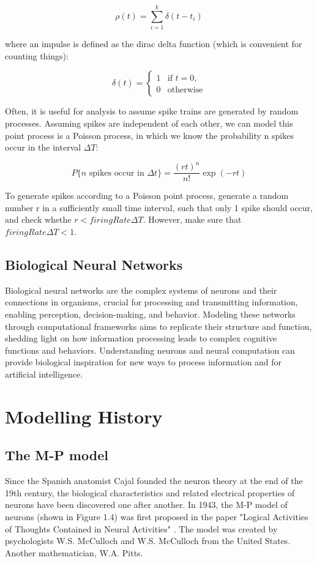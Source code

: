 \documentclass[12pt,a4paper]{report}
\begin{document}
\begin{equation}
    \rho(t) = \sum_{i=1}^{k} \delta(t-t_i)
\end{equation}

where an impulse is defined as the dirac delta function (which is convenient for counting things):

\begin{equation}
    \delta(t) = \begin{cases} 1 & \text{if } t = 0, \\ 0 & \text{otherwise} \end{cases}
\end{equation}

Often, it is useful for analysis to assume spike trains are generated by random processes. Assuming spikes are independent of each other, we can model this point process is a Poisson process, in which we know the probability n spikes occur in the interval $\Delta T$:

\begin{equation}
    P\{n \text{ spikes occur in } \Delta t\} = \frac{(rt)^n}{n!} \exp(-rt)
\end{equation}

To generate spikes according to a Poisson point process, generate a random number r in a sufficiently small time interval, such that only 1 spike should occur, and check whethe $r < firingRate \Delta T$. However, make sure that $firingRate\Delta T < 1$.

\section{Biological Neural Networks}
Biological neural networks are the complex systems of neurons and their connections in organisms, crucial for processing and transmitting information, enabling perception, decision-making, and behavior. Modeling these networks through computational frameworks aims to replicate their structure and function, shedding light on how information processing leads to complex cognitive functions and behaviors. 
Understanding neurons and neural computation can provide biological inspiration for new ways to process information and for artificial intelligence.


\chapter{Modelling History}

\section{The M-P model}
Since the Spanish anatomist Cajal founded the neuron theory at the end of the 19th century, the biological characteristics and related electrical properties of neurons have been discovered one after another. In 1943, the M-P model of neurons (shown in Figure 1.4) was first proposed in the paper "Logical Activities of Thoughts Contained in Neural Activities" \cite{Mcculloch1854LOGICALCALCULUSIDEAS}. The model was created by psychologists W.S. McCulloch and W.S. McCulloch from the United States. Another mathematician, W.A. Pitts.
\end{document}
